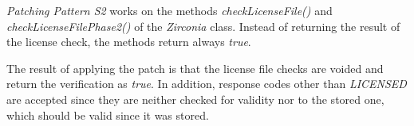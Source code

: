 \newline
\textit{Patching Pattern S2} works on the methods \textit{checkLicenseFile()} and \textit{checkLicenseFilePhase2()} of the \textit{Zirconia} class.
Instead of returning the result of the license check, the methods return always \textit{true}.

The result of applying the patch is that the license file checks are voided and return the verification as \textit{true}.
In addition, response codes other than \textit{LICENSED} are accepted since they are neither checked for validity nor to the stored one, which should be valid since it was stored.
